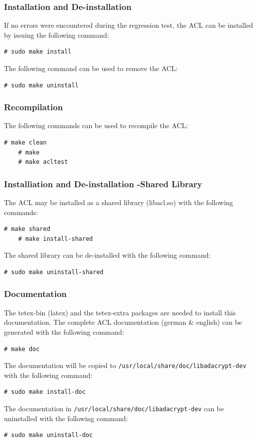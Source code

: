 \subsubsection{Installation and De-installation}
If no errors were encountered during the regression test, the ACL can
be installed by issuing the following command:\bigskip
\begin{lstlisting}[style=BashInputStyle]
    # sudo make install
\end{lstlisting}
The following command can be used to remove the ACL:\bigskip
\begin{lstlisting}[style=BashInputStyle]
    # sudo make uninstall
\end{lstlisting}

\subsubsection{Recompilation}
The following commands can be used to recompile the ACL:\bigskip
\begin{lstlisting}[style=BashInputStyle]
    # make clean
    # make
    # make acltest
\end{lstlisting}

\subsubsection{Installiation and De-installation -Shared Library}
The ACL may be installed as a shared library (libacl.so) with the
following commands:\bigskip
\begin{lstlisting}[style=BashInputStyle]
    # make shared
    # make install-shared
\end{lstlisting}
The shared library can be de-installed with the following command:\bigskip
\begin{lstlisting}[style=BashInputStyle]
    # sudo make uninstall-shared
\end{lstlisting}

\subsubsection{Documentation}
The tetex-bin (latex) and the tetex-extra packages are needed to
install this documentation. The complete ACL documentation (german \&
english) can be generated with the following command:\bigskip
\begin{lstlisting}[style=BashInputStyle]
    # make doc
\end{lstlisting}
The documentation will be copied to
\texttt{/usr/local/share/doc/libadacrypt-dev} with the following command:\bigskip
\begin{lstlisting}[style=BashInputStyle]
    # sudo make install-doc
\end{lstlisting}
The documentation in \texttt{/usr/local/share/doc/libadacrypt-dev} can
be uninstalled with the following command:\bigskip
\begin{lstlisting}[style=BashInputStyle]
    # sudo make uninstall-doc
\end{lstlisting}

